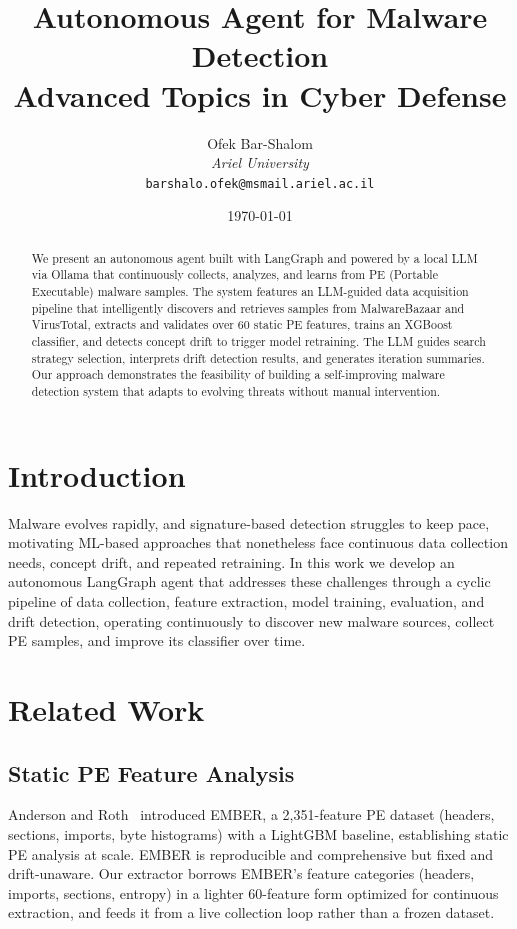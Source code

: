 \documentclass[12pt,a4paper]{article}
\title{
    \textbf{Autonomous Agent for Malware Detection} \\[0.5em]
    \large Advanced Topics in Cyber Defense
}
\author{
    Ofek Bar-Shalom \\
    \textit{Ariel University} \\
    \texttt{barshalo.ofek@msmail.ariel.ac.il}
}
\date{\today}
\begin{document}
\maketitle

\begin{abstract}
We present an autonomous agent built with LangGraph and powered by a  local LLM via Ollama that continuously collects, analyzes, and learns from PE (Portable Executable) malware samples. The system features an LLM-guided data acquisition pipeline that intelligently discovers and retrieves samples from MalwareBazaar and VirusTotal, extracts and validates over 60 static PE features, trains an XGBoost classifier, and detects concept drift to trigger model retraining. The LLM guides search strategy selection, interprets drift detection results, and generates iteration summaries. Our approach demonstrates the feasibility of building a self-improving malware detection system that adapts to evolving threats without manual intervention.
\end{abstract}

\section{Introduction}
\label{sec:introduction}

Malware evolves rapidly, and signature-based detection struggles to keep pace, motivating ML-based approaches that nonetheless face continuous data collection needs, concept drift, and repeated retraining. In this work we develop an autonomous LangGraph agent that addresses these challenges through a cyclic pipeline of data collection, feature extraction, model training, evaluation, and drift detection, operating continuously to discover new malware sources, collect PE samples, and improve its classifier over time.

\section{Related Work}
\label{sec:related}

\subsection{Static PE Feature Analysis}

Anderson and Roth~\cite{anderson2018ember} introduced EMBER, a 2{,}351-feature PE dataset (headers, sections, imports, byte histograms) with a LightGBM baseline, establishing static PE analysis at scale. EMBER is reproducible and comprehensive but fixed and drift-unaware. Our extractor borrows EMBER's feature categories (headers, imports, sections, entropy) in a lighter 60-feature form optimized for continuous extraction, and feeds it from a live collection loop rather than a frozen dataset.
\end{document}
